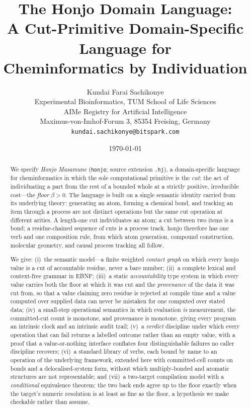 \documentclass[11pt,twocolumn,a4paper]{article}
\title{\textbf{The Honjo Domain Language:\\[3pt]
A Cut-Primitive Domain-Specific Language for\\
Cheminformatics by Individuation}}
\author{%
Kundai Farai Sachikonye\\[0.3em]
\normalsize Experimental Bioinformatics, TUM School of Life Sciences\\
\normalsize AIMe Registry for Artificial Intelligence \\
\normalsize Maximus-von-Imhof-Forum 3, 85354 Freising, Germany\\
\normalsize \texttt{kundai.sachikonye@bitspark.com}}
\date{\today}
\theoremstyle{thmstyle}
\theoremstyle{definition}
\theoremstyle{remark}
\newcommand{\flo}{\beta}
\newcommand{\hj}[1]{\texttt{#1}}
\begin{document}
\maketitle

\tableofcontents

\begin{abstract}
\noindent
We specify \emph{Honjo Masamune} (\hj{honjo}; source extension
\hj{.hj}), a domain-specific language for cheminformatics in which the
sole computational primitive is the \emph{cut}: the act of individuating
a part from the rest of a bounded whole at a strictly positive,
irreducible cost---the \emph{floor} $\flo>0$. The language is built on a
single semantic identity carried from its underlying theory: generating
an atom, forming a chemical bond, and tracking an item through a process
are not distinct operations but the same cut operation at different
arities. A length-one cut individuates an atom; a cut between two items is
a bond; a residue-chained sequence of cuts is a process track. honjo
therefore has one verb and one composition rule, from which atom
generation, compound construction, molecular geometry, and causal
process tracking all follow.

We give: (i)~the semantic model---a finite weighted \emph{contact graph}
on which every honjo value is a cut of accountable residue, never a bare
number; (ii)~a complete lexical and context-free grammar in EBNF;
(iii)~a static \emph{accountability} type system in which every value
carries both the floor at which it was cut and the \emph{provenance} of
the data it was cut from, so that a value claiming zero residue is
rejected at compile time and a value computed over supplied data can
never be mistaken for one computed over stated data;
(iv)~a small-step operational semantics in which evaluation \emph{is}
measurement, the committed-cut count is monotone, and provenance is
monotone, giving every program an intrinsic clock and an intrinsic
audit trail; (v)~a \emph{verdict} discipline under which every operation
that can fail returns a labelled outcome rather than an empty value, with
a proof that a value-or-nothing interface conflates four distinguishable
failures no caller discipline recovers; (vi)~a standard library of verbs,
each bound by name to an operation of the underlying framework, extended
here with committed-cell counts on bonds and a delocalised-system form,
without which multiply-bonded and aromatic structures are not
representable; and (vii)~a two-target compilation model with a
\emph{conditional} equivalence theorem: the two back ends agree up to the
floor exactly when the target's numeric resolution is at least as fine as
the floor, a hypothesis we make checkable rather than assume.


\end{abstract}
\end{document}
